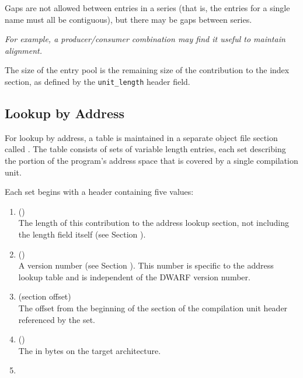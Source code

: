Gaps are not allowed between entries in a series (that is, the entries
for a single name must all be contiguous), but there may be gaps
between series.

\textit{For example, a producer/consumer combination may find
it useful to maintain alignment.}

The size of the entry pool is the remaining size of the contribution to
the index section, as defined by the \texttt{unit\_length} header field.

\subsection{Lookup by Address}
\label{chap:lookupbyaddress}
For 
lookup by address, a table is maintained in a separate
object file section called 
\dotdebugaranges{}. The table consists
of sets of variable length entries, each set describing the
portion of the program\textquoteright{}s address space that is covered by
a single compilation unit.

Each set begins with a header containing five values:
\begin{enumerate}[1. ]
\item \HFNunitlength{} () \\
The length of this contribution to the address lookup section,
not including the length field itself 
\bb
(see Section ).
\eb

\item \HFNversion{} (\HFTuhalf) \\
A version number
(see Section ). 
This number is specific to the address lookup table and is
independent of the DWARF version number.

\item \HFNdebuginfooffset{} (section offset) \\
The offset from the
beginning of the \dotdebuginfo{} section of the
compilation unit header referenced by the set.

\item \HFNaddresssize{} (\HFTubyte) \\
The 
in bytes on the target architecture. 
\db

\item \HFNreservedwassegmentselectorsize{} 
\bbeb 
\\

\end{enumerate}

